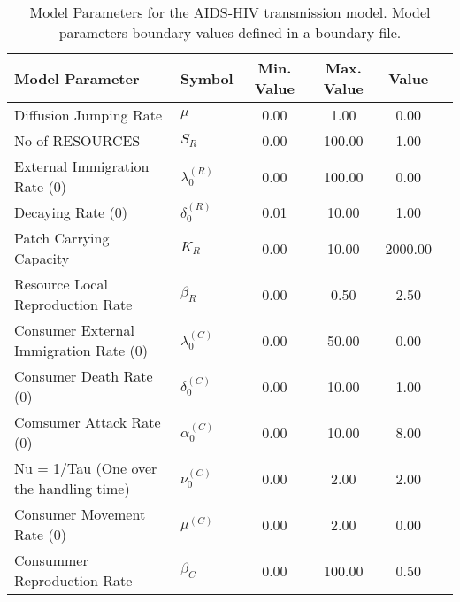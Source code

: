 \begin{table}
\centering
\begin{tabular}{p{5cm}lcccc}
{\bf Model Parameter} & {\bf Symbol} & {\bf Min. Value} & {\bf Max. Value} & {\bf Value}\\
\hline\hline
Diffusion Jumping Rate & $\mu$ & 0.00 & 1.00 & 0.00\\
No of RESOURCES & $S_R$ & 0.00 & 100.00 & 1.00\\
External Immigration Rate (0) & $\lambda^{(R)}_0$ & 0.00 & 100.00 & 0.00\\
Decaying Rate (0) & $\delta^{(R)}_0$ & 0.01 & 10.00 & 1.00\\
Patch Carrying Capacity & $K_R$ & 0.00 & 10.00 & 2000.00\\
Resource Local Reproduction Rate & $\beta_R$ & 0.00 & 0.50 & 2.50\\
Consumer External Immigration Rate (0) & $\lambda^{(C)}_0$ & 0.00 & 50.00 & 0.00\\
Consumer Death Rate (0) & $\delta^{(C)}_0$ & 0.00 & 10.00 & 1.00\\
Comsumer Attack Rate (0) & $\alpha^{(C)}_0$ & 0.00 & 10.00 & 8.00\\
Nu = 1/Tau (One over the handling time) & $\nu^{(C)}_0$ & 0.00 & 2.00 & 2.00\\
Consumer Movement Rate (0) & $\mu^{(C)}$ & 0.00 & 2.00 & 0.00\\
Consummer Reproduction Rate & $\beta_C$ & 0.00 & 100.00 & 0.50\\
\hline\hline
\end{tabular}
\caption{Model Parameters for the AIDS-HIV transmission model. Model parameters boundary values defined in a boundary file.}
\end{table}
